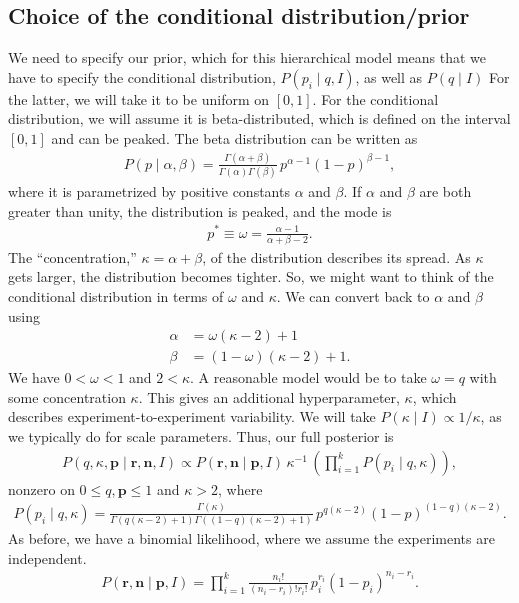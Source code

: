 \subsection{Choice of the conditional distribution/prior}
We need to specify our prior, which for this hierarchical model means
that we have to specify the conditional distribution,
$P(p_i\mid q, I)$, as well as $P(q\mid I)$ For the latter, we will
take it to be uniform on $[0, 1]$.  For the conditional distribution,
we will assume it is beta-distributed, which is defined on the
interval $[0,1]$ and can be peaked.  The beta distribution can be
written as
\begin{align}
P(p\mid \alpha, \beta) = \frac{\Gamma(\alpha+\beta)}{\Gamma(\alpha)\Gamma(\beta)}\,
p^{\alpha-1}(1-p)^{\beta-1},
\end{align}
where it is parametrized by positive constants $\alpha$ and $\beta$.
If $\alpha$ and $\beta$ are both greater than unity, the distribution
is peaked, and the mode is
\begin{align}
  p^* \equiv \omega = \frac{\alpha - 1}{\alpha + \beta - 2}.
\end{align}
The ``concentration,'' $\kappa = \alpha + \beta$, of the distribution
describes its spread.  As $\kappa$ gets larger, the distribution
becomes tighter.  So, we might want to think of the conditional
distribution in terms of $\omega$ and $\kappa$.  We can convert back
to $\alpha$ and $\beta$ using
\begin{align}
  \alpha &= \omega(\kappa - 2) + 1 \\
  \beta &= (1-\omega)(\kappa - 2) + 1.
\end{align}
We have $0 < \omega < 1$ and $2 < \kappa$.  A reasonable model would
be to take $\omega = q$ with some concentration $\kappa$.  This gives
an additional hyperparameter, $\kappa$, which describes
experiment-to-experiment variability.  We will take
$P(\kappa\mid I) \propto 1/\kappa$, as we typically do for scale
parameters.  Thus, our full posterior is
\begin{align}
P(q, \kappa,\mathbf{p}\mid \mathbf{r}, \mathbf{n},I) \propto
P(\mathbf{r},\mathbf{n}\mid \mathbf{p}, I)\,
\kappa^{-1}\,\left(\prod_{i=1}^k P(p_i\mid q,\kappa)\right),
\end{align}
nonzero on $0\le q,\mathbf{p} \le 1$ and $\kappa > 2$, where
\begin{align}
P(p_i\mid q, \kappa) =  \frac{\Gamma(\kappa)}{\Gamma(q(\kappa - 2) + 1)\Gamma((1-q)(\kappa - 2) + 1)}\,
p^{q(\kappa - 2)}(1-p)^{(1-q)(\kappa - 2)}.
\end{align}
As before, we have a binomial likelihood, where we assume the
experiments are independent.
\begin{align}
P(\mathbf{r},\mathbf{n}\mid \mathbf{p}, I) = \prod_{i=1}^k \frac{n_i!}{(n_i-r_i)!r_i!}\,
p_i^{r_i}(1-p_i)^{n_i-r_i}.
\end{align}


